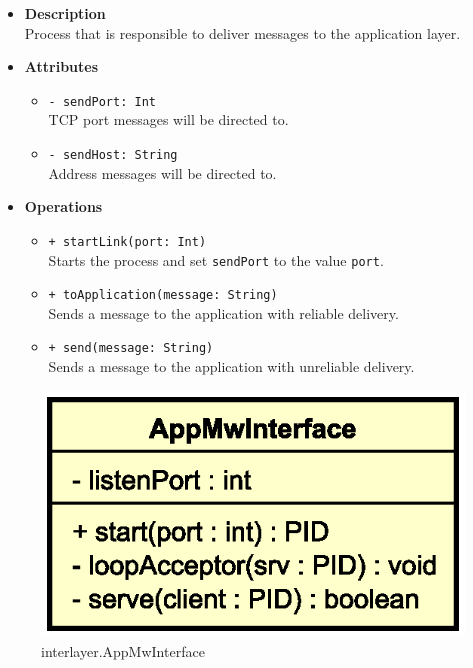\FloatBarrier
\begin{itemize}
  \item \textbf{Description} \\
    Process that is responsible to deliver messages to the application layer.
  \item \textbf{Attributes}
    \begin{itemize}
      \item \texttt{- sendPort: Int} \\
    TCP port messages will be directed to.
      \item \texttt{- sendHost: String} \\
    Address messages will be directed to.
    \end{itemize}
  \item \textbf{Operations}
  \begin{itemize}
    \item \texttt{+ startLink(port: Int)} \\
    Starts the process and set \texttt{sendPort} to the value \texttt{port}.
    \item \texttt{+ toApplication(message: String)} \\
    Sends a message to the application with reliable delivery.
    \item \texttt{+ send(message: String)} \\
    Sends a message to the application with unreliable delivery.
  \end{itemize}
\end{itemize}


\begin{figure}[H]
  \centering
  \includegraphics[width=.4\columnwidth]{images/solution/mw/int/appmw.eps}
  \caption{interlayer.AppMwInterface}
  \label{fig:mw-interlayer-appmwinterface}
\end{figure}

